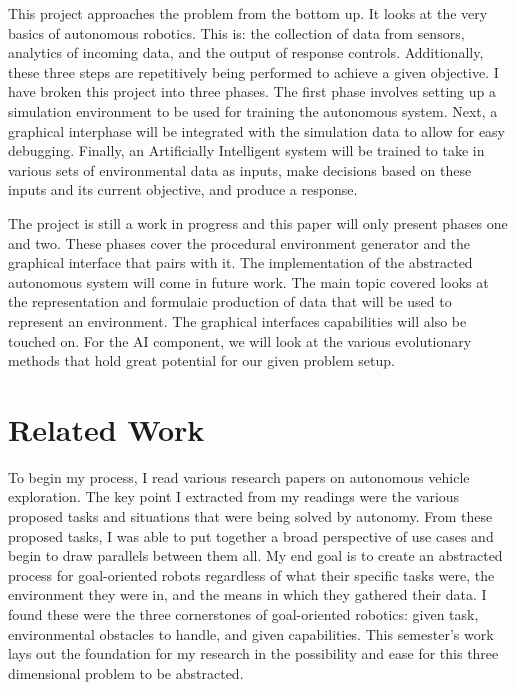 \documentclass[]{report}
\begin{document}
This project approaches the problem from the bottom up.
It looks at the very basics of autonomous robotics.
This is: the collection of data from sensors, analytics of incoming data, and the output of response controls.
Additionally, these three steps are repetitively being performed to achieve a given objective.
I have broken this project into three phases.
The first phase involves setting up a simulation environment to be used for training the autonomous system.
Next, a graphical interphase will be integrated with the simulation data to allow for easy debugging.
Finally, an Artificially Intelligent system will be trained to take in various sets of environmental data as inputs, make decisions based on these inputs and its current objective, and produce a response.

The project is still a work in progress and this paper will only present phases one and two.
These phases cover the procedural environment generator and the graphical interface that pairs with it.
The implementation of the abstracted autonomous system will come in future work.
The main topic covered looks at the representation and formulaic production of data that will be used to represent an environment.
The graphical interfaces capabilities will also be touched on.
For the AI component, we will look at the various evolutionary methods that hold great potential for our given problem setup.



\chapter{Related Work}
To begin my process, I read various research papers on autonomous vehicle exploration.
The key point I extracted from my readings were the various proposed tasks and situations that were being solved by autonomy.
From these proposed tasks, I was able to put together a broad perspective of use cases and begin to draw parallels between them all.
My end goal is to create an abstracted process for goal-oriented robots regardless of what their specific tasks were, the environment they were in, and the means in which they gathered their data.
I found these were the three cornerstones of goal-oriented robotics: given task, environmental obstacles to handle, and given capabilities.
This semester’s work lays out the foundation for my research in the possibility and ease for this three dimensional problem to be abstracted.
\end{document}
